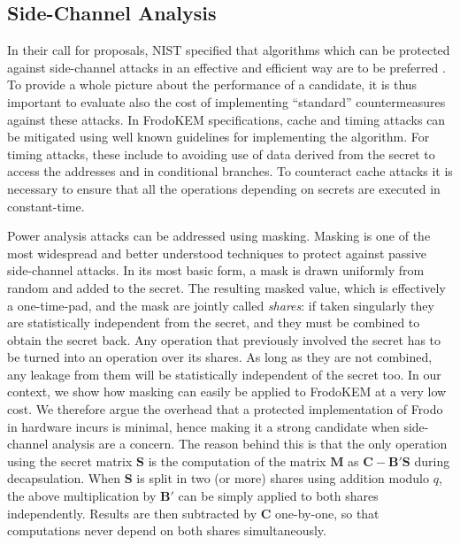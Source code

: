 \vspace{-0.2cm}

\subsection{Side-Channel Analysis} \label{sec:mask}

In their call for proposals, NIST specified that algorithms which can be protected against side-channel attacks in an effective and efficient way are to be preferred \cite{nistsca}. To provide a whole picture about the performance of a candidate, it is thus important to evaluate also the cost of implementing ``standard'' countermeasures against these attacks. In FrodoKEM specifications, cache and timing attacks can be mitigated using well known guidelines for implementing the algorithm. For timing attacks, these include to avoiding use of data derived from the secret to access the addresses and in conditional branches. To counteract cache attacks it is necessary to ensure that all the operations depending on secrets are executed in constant-time.

Power analysis attacks can be addressed using masking. Masking is one of the most widespread and better understood techniques to protect
against passive side-channel attacks. In its most basic form, a mask is drawn uniformly from random and added to the secret. The resulting masked value, which is effectively a one-time-pad, and the mask are jointly called \emph{shares}: if taken
singularly they are statistically independent from the secret, and they must be combined to obtain the secret back. Any operation that previously involved the secret has to be turned into an operation over its shares. As long as they are not combined, any leakage from them will be statistically independent of the secret too. In our context, we show how masking can easily be applied to FrodoKEM at a very low cost. We therefore argue the overhead that a protected implementation of Frodo in hardware incurs is minimal, hence making it a strong candidate when side-channel analysis are a concern. The reason behind this is that the only operation using the secret matrix $\mathbf{S}$ is the computation of the matrix $\mathbf{M}$ as $\mathbf{C} - \mathbf{B}'\mathbf{S}$ during decapsulation. When $\mathbf{S}$ is split in two (or more) shares using addition modulo $q$, the above multiplication by $\mathbf{B}'$ can be simply applied to both shares independently. Results are then subtracted by $\mathbf{C}$ one-by-one, so that computations never depend on both shares simultaneously.
